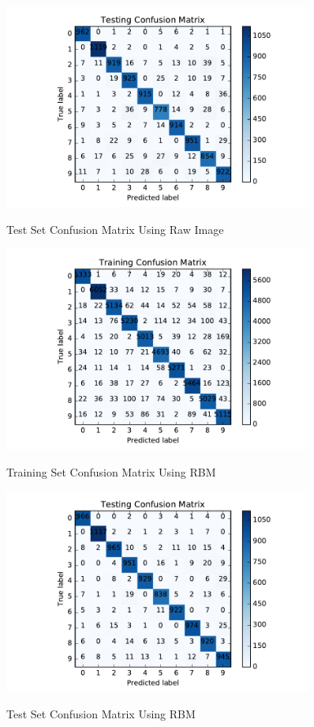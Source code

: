 \begin{figure}[H]
\centering
\includegraphics[width=0.9\textwidth]{./figures/test_raw.pdf}\
\caption{\label{fig:test_raw} Test Set Confusion Matrix Using Raw Image}
\end{figure}


\begin{figure}[H]
\centering
\includegraphics[width=0.9\textwidth]{./figures/train_rbm.pdf}\
\caption{\label{fig:train_rbm} Training Set Confusion Matrix Using RBM}
\end{figure}

\begin{figure}[H]
\centering
\includegraphics[width=0.9\textwidth]{./figures/test_rbm.pdf}\
\caption{\label{fig:test_rbm} Test Set Confusion Matrix Using RBM}
\end{figure}


